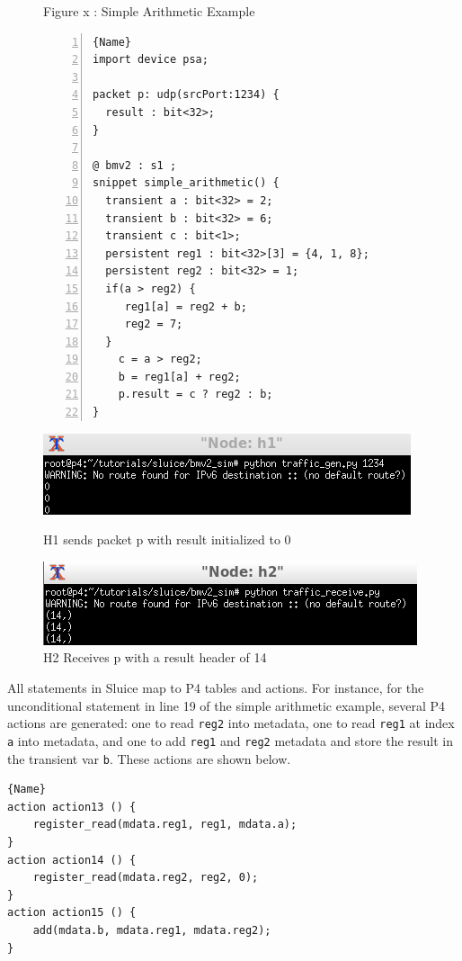 \documentclass[12pt, oneside]{article}
\begin{document}
\begin{figure}
\caption{Figure x : Simple Arithmetic Example}
\captionsetup{justification=centering, font=footnotesize,labelfont=footnotesize}
\begin{minipage}{.46\textwidth} 
\begin{lstlisting}[numbers=left, firstnumber=1, frame=tlrb, basicstyle=\linespread{1.3}\scriptsize]{Name}
import device psa;

packet p: udp(srcPort:1234) {
  result : bit<32>;
}

@ bmv2 : s1 ;
snippet simple_arithmetic() {
  transient a : bit<32> = 2;
  transient b : bit<32> = 6;
  transient c : bit<1>;
  persistent reg1 : bit<32>[3] = {4, 1, 8};
  persistent reg2 : bit<32> = 1;
  if(a > reg2) {
     reg1[a] = reg2 + b;
     reg2 = 7;
  }
    c = a > reg2;
    b = reg1[a] + reg2;
    p.result = c ? reg2 : b;
}
\end{lstlisting}
\end{minipage}
\qquad
\begin{minipage}{0.45\textwidth} 
\includegraphics[scale=.6]{figures/arith_ex_1} 
\caption{H1 sends packet p with result initialized to 0\newline}

\includegraphics[scale=.6]{figures/arith_ex_2}
\caption{H2 Receives p with a result header of 14}
\end{minipage}
\end{figure}

All statements in Sluice map to P4 tables and actions. For instance, for the unconditional statement in line 19 of the simple arithmetic example, several P4 actions are generated: one to read \texttt{reg2} into metadata, one to read \texttt{reg1} at index \texttt{a} into metadata, and one to add \texttt{reg1} and \texttt{reg2} metadata and store the result in the transient var \texttt{b}. These actions are shown below.   

\begin{lstlisting}[caption=Line 19 Actions,frame=tlrb, basicstyle=\linespread{1.3}\scriptsize]{Name}
action action13 () {
    register_read(mdata.reg1, reg1, mdata.a);
}
action action14 () {
    register_read(mdata.reg2, reg2, 0);
}
action action15 () {
    add(mdata.b, mdata.reg1, mdata.reg2);
}
\end{lstlisting}
\end{document}
